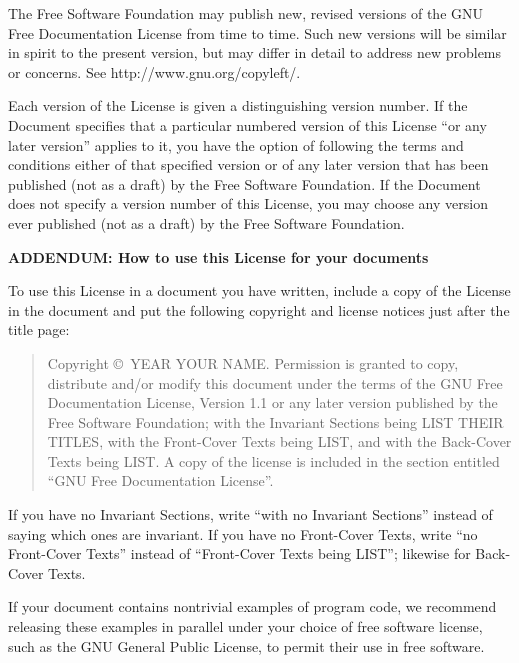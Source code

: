 The Free Software Foundation may publish new, revised versions
of the GNU Free Documentation License from time to time.  Such new
versions will be similar in spirit to the present version, but may
differ in detail to address new problems or concerns. See
http://www.gnu.org/copyleft/.

Each version of the License is given a distinguishing version number.
If the Document specifies that a particular numbered version of this
License ``or any later version'' applies to it, you have the option of
following the terms and conditions either of that specified version or
of any later version that has been published (not as a draft) by the
Free Software Foundation.  If the Document does not specify a version
number of this License, you may choose any version ever published (not
as a draft) by the Free Software Foundation.

\begin{center}
{\Large\bf ADDENDUM: How to use this License for your documents\par}
\end{center}

To use this License in a document you have written, include a copy of
the License in the document and put the following copyright and
license notices just after the title page:

\begin{quote}

      Copyright \copyright\ YEAR  YOUR NAME.
      Permission is granted to copy, distribute and/or modify this document
      under the terms of the GNU Free Documentation License, Version 1.1
      or any later version published by the Free Software Foundation;
      with the Invariant Sections being LIST THEIR TITLES, with the
      Front-Cover Texts being LIST, and with the Back-Cover Texts being LIST.
      A copy of the license is included in the section entitled ``GNU
      Free Documentation License''.

\end{quote}

If you have no Invariant Sections, write ``with no Invariant Sections''
instead of saying which ones are invariant.  If you have no
Front-Cover Texts, write ``no Front-Cover Texts'' instead of
``Front-Cover Texts being LIST''; likewise for Back-Cover Texts.

If your document contains nontrivial examples of program code, we
recommend releasing these examples in parallel under your choice of
free software license, such as the GNU General Public License,
to permit their use in free software.
\fi

